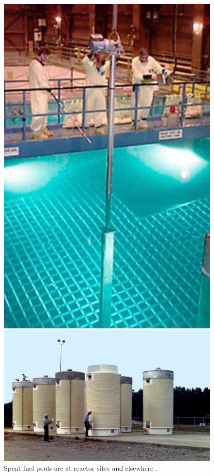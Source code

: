

  \begin{figure}[htbp!]
    \begin{center}
    \begin{minipage}[t]{0.45\textwidth}
      \includegraphics[height=0.4\textheight]{pool.eps}
      \caption{Spent fuel pools are at reactor sites and elsewhere 
        \cite{doe_spent_????}.}
        \label{fig:pool}
      \includegraphics[height=0.4\textheight]{casks.eps}

\end{minipage}
\end{center}
\end{figure}
